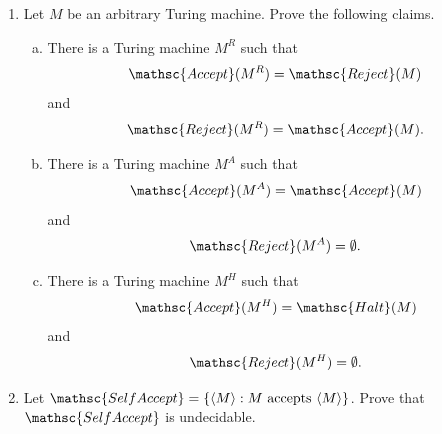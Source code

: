 \documentclass[11pt]{article}
\begin{document}


\begin{enumerate}
\item 
Let $M$ be an arbitrary Turing machine. Prove the following claims.
\begin{enumerate}[(a)]
    \item There is a Turing machine $M^R$ such that $$\mathsc{Accept}(M^R) =
    \mathsc{Reject}(M)$$ and $$\mathsc{Reject}(M^R)=\mathsc{Accept}(M).$$
    \item There is a Turing machine $M^A$ such that $$\mathsc{Accept}(M^A) =
    \mathsc{Accept}(M)$$ and $$\mathsc{Reject}(M^A)=\emptyset.$$
    \item There is a Turing machine $M^H$ such that $$\mathsc{Accept}(M^H) =
    \mathsc{Halt}(M)$$ and $$\mathsc{Reject}(M^H)=\emptyset.$$
\end{enumerate}

\item Let $\mathsc{SelfAccept} = \{\langle M \rangle: M \text{ accepts } \langle
M \rangle \}$. Prove that $\mathsc{SelfAccept}$ is undecidable.


\end{enumerate}
\end{document}
